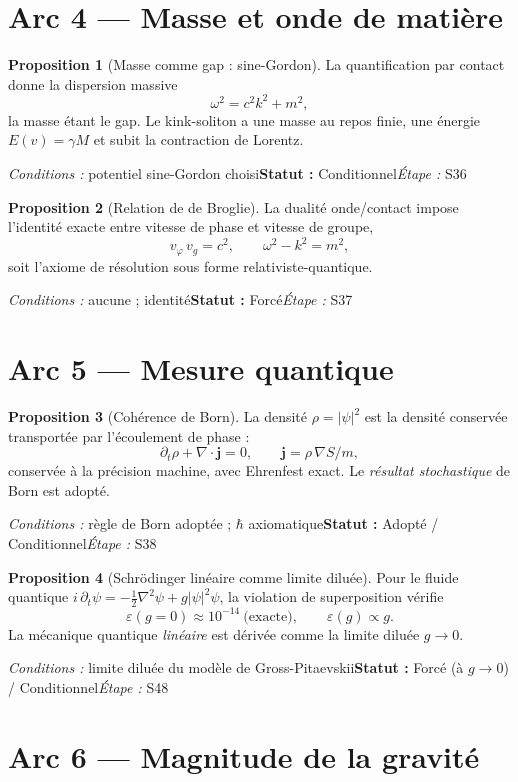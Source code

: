 \documentclass[11pt,a4paper]{article}
\theoremstyle{definition}
\newtheorem{prop}{Proposition}
\newcommand{\statut}[3]{\par\smallskip\noindent\textit{Conditions :} #1\quad\textbf{Statut :} #2\quad\textit{Étape :} #3\par\medskip}
\begin{document}
\section*{Arc 4 — Masse et onde de matière}

\begin{prop}[Masse comme gap : sine-Gordon]
La quantification par contact donne la dispersion massive
\[ \omega^2=c^2k^2+m^2, \]
la masse étant le gap. Le kink-soliton a une masse au repos finie, une énergie $E(v)=\gamma M$ et subit la contraction de Lorentz.
\end{prop}
\statut{potentiel sine-Gordon choisi}{Conditionnel}{S36}

\begin{prop}[Relation de de Broglie]
La dualité onde/contact impose l'identité exacte entre vitesse de phase et vitesse de groupe,
\[ v_\varphi\, v_g = c^2,\qquad \omega^2-k^2=m^2, \]
soit l'axiome de résolution sous forme relativiste-quantique.
\end{prop}
\statut{aucune ; identité}{Forcé}{S37}

\section*{Arc 5 — Mesure quantique}

\begin{prop}[Cohérence de Born]
La densité $\rho=|\psi|^2$ est la densité conservée transportée par l'écoulement de phase :
\[ \partial_t\rho+\nabla\!\cdot\! \mathbf j=0,\qquad \mathbf j=\rho\,\nabla S/m, \]
conservée à la précision machine, avec Ehrenfest exact. Le \emph{résultat stochastique} de Born est adopté.
\end{prop}
\statut{règle de Born adoptée ; $\hbar$ axiomatique}{Adopté / Conditionnel}{S38}

\begin{prop}[Schrödinger linéaire comme limite diluée]
Pour le fluide quantique $i\,\partial_t\psi=-\tfrac12\nabla^2\psi+g|\psi|^2\psi$, la violation de superposition vérifie
\[ \varepsilon(g=0)\approx 10^{-14}\ \text{(exacte)},\qquad \varepsilon(g)\propto g. \]
La mécanique quantique \emph{linéaire} est dérivée comme la limite diluée $g\to 0$.
\end{prop}
\statut{limite diluée du modèle de Gross-Pitaevskii}{Forcé (à $g\to0$) / Conditionnel}{S48}

\section*{Arc 6 — Magnitude de la gravité}
\end{document}

